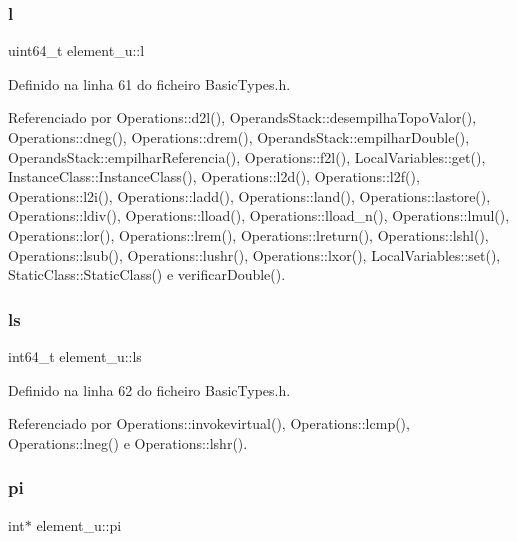 \mbox{\label{unionelement__u_aca3c96df160bc775791470b98e15710f}} 
\subsubsection{\texorpdfstring{l}{l}}
{\footnotesize\ttfamily uint64\+\_\+t element\+\_\+u\+::l}



Definido na linha 61 do ficheiro Basic\+Types.\+h.



Referenciado por Operations\+::d2l(), Operands\+Stack\+::desempilha\+Topo\+Valor(), Operations\+::dneg(), Operations\+::drem(), Operands\+Stack\+::empilhar\+Double(), Operands\+Stack\+::empilhar\+Referencia(), Operations\+::f2l(), Local\+Variables\+::get(), Instance\+Class\+::\+Instance\+Class(), Operations\+::l2d(), Operations\+::l2f(), Operations\+::l2i(), Operations\+::ladd(), Operations\+::land(), Operations\+::lastore(), Operations\+::ldiv(), Operations\+::lload(), Operations\+::lload\+\_\+n(), Operations\+::lmul(), Operations\+::lor(), Operations\+::lrem(), Operations\+::lreturn(), Operations\+::lshl(), Operations\+::lsub(), Operations\+::lushr(), Operations\+::lxor(), Local\+Variables\+::set(), Static\+Class\+::\+Static\+Class() e verificar\+Double().

\mbox{\label{unionelement__u_af52b13fa38bfc4e5a98d4b868324ee27}} 
\subsubsection{\texorpdfstring{ls}{ls}}
{\footnotesize\ttfamily int64\+\_\+t element\+\_\+u\+::ls}



Definido na linha 62 do ficheiro Basic\+Types.\+h.



Referenciado por Operations\+::invokevirtual(), Operations\+::lcmp(), Operations\+::lneg() e Operations\+::lshr().

\mbox{\label{unionelement__u_a3c7acdaf4dc01ef8694967376100fc8f}} 
\subsubsection{\texorpdfstring{pi}{pi}}
{\footnotesize\ttfamily int$\ast$ element\+\_\+u\+::pi}



